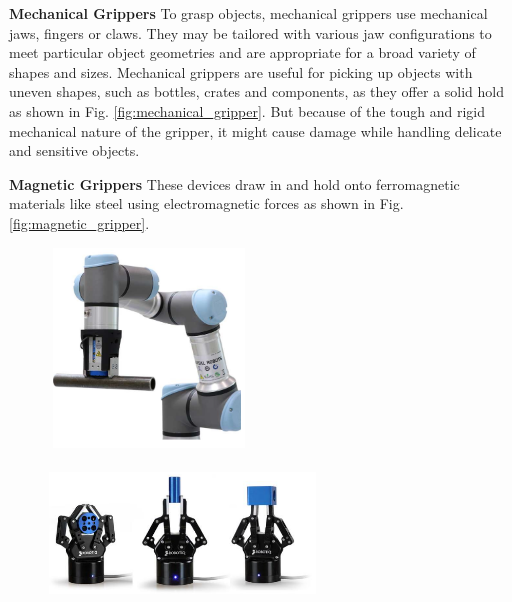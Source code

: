 \vspace{5mm}

\textbf{Mechanical Grippers} To grasp objects, mechanical grippers use mechanical jaws, fingers or claws. They may be tailored with various jaw configurations to meet particular object geometries and are appropriate for a broad variety of shapes and sizes. Mechanical grippers are useful for picking up objects with uneven shapes, such as bottles, crates and components, as they offer a solid hold as shown in Fig. \ref{fig:mechanical_gripper}. But because of the tough and rigid mechanical nature of the gripper, it might cause damage while handling delicate and sensitive objects.\cite{fager2020gripper}

\vspace{5mm}

\textbf{Magnetic Grippers} These devices draw in and hold onto ferromagnetic materials like steel using electromagnetic forces as shown in Fig. \ref{fig:magnetic_gripper}.
\begin{figure}
  \centering
  \begin{minipage}[t]{.45\textwidth}
    \centering
    \includegraphics[width=150pt,height=150pt]{pictures/magnetic_gripper.PNG}
    \label{fig:magnetic_gripper}
  \end{minipage}%
  \hspace{1cm}
  \begin{minipage}[t]{.45\textwidth}
    \centering
    \includegraphics[width=200pt,height=100pt]{pictures/adaptive_gripper.PNG}
    \label{fig:adaptive_gripper}
  \end{minipage}
\end{figure}
